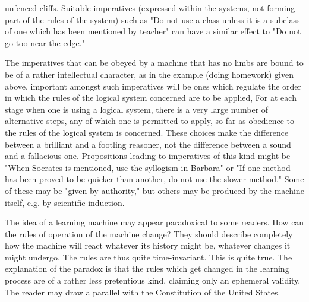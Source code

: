 \documentclass{article}
\begin{document}
unfenced cliffs. Suitable imperatives (expressed within the systems, not forming part of the rules of the system) such as "Do not use a class unless it is a subclass of one which has been mentioned by teacher" can have a similar effect to "Do not go too near the edge."

The imperatives that can be obeyed by a machine that has no limbs are bound to be of a rather intellectual character, as in the example (doing homework) given above. important amongst such imperatives will be ones which regulate the order in which the rules of the logical system concerned are to be applied, For at each stage when one is using a logical system, there is a very large number of alternative steps, any of which one is permitted to apply, so far as obedience to the rules of the logical system is concerned. These choices make the difference between a brilliant and a footling reasoner, not the difference between a sound and a fallacious one. Propositions leading to imperatives of this kind might be "When Socrates is mentioned, use the syllogism in Barbara" or "If one method has been proved to be quicker than another, do not use the slower method." Some of these may be "given by authority," but others may be produced by the machine itself, e.g. by scientific induction.

The idea of a learning machine may appear paradoxical to some readers. How can the rules of operation of the machine change? They should describe completely how the machine will react whatever its history might be, whatever changes it might undergo. The rules are thus quite time-invariant. This is quite true. The explanation of the paradox is that the rules which get changed in the learning process are of a rather less pretentious kind, claiming only an ephemeral validity. The reader may draw a parallel with the Constitution of the United States.
\end{document}
